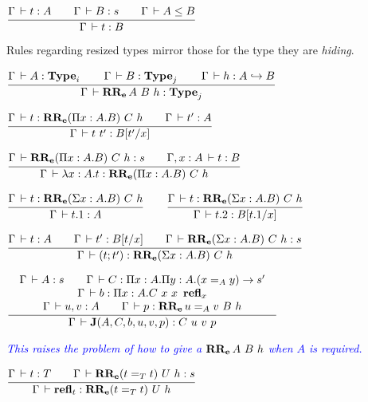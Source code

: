 \documentclass[a4paper,english]{lipics-utf8x}
\newcommand\meta[1]{\noindent\textcolor{blue}{\emph{#1}}}
\begin{document}
  \begin{center}
  \(
    \ru{\Gamma \der t : A \qquad
        \Gamma \der B : s \qquad
        \Gamma \der A \le B
      }{\Gamma \der t : B}
  \)
  \end{center}

  \noindent %
  Rules regarding resized types mirror those for the type they are
  \emph{hiding}.

  \begin{center}
  \(
    \ru{\Gamma \der A : \Type_i \qquad
        \Gamma \der B : \Type_j \qquad
        \Gamma \der h : \emb{A}{B}
      }{\Gamma \der \RRe{A}{B}{h} : \Type_j}
  \)
  \end{center}

  \begin{center}
  \(
    \ru{\Gamma \der t : \RRe{(\Pi x:A.B)}{C}{h} \qquad
        \Gamma \der t' : A
      }{\Gamma \der t\ t' : B[t'/x]}
  \)
  \end{center}

  \begin{center}
  \(
    \ru{\Gamma \der \RRe{(\Pi x:A.B)}{C}{h} : s \qquad
        \Gamma, x:A \der t : B
      }{\Gamma \der \lambda x:A.t : \RRe{(\Pi x:A.B)}{C}{h}}
  \)
  \end{center}

  \begin{center}
  \(
    \ru{\Gamma \der t : \RRe{(\Sigma x:A.B)}{C}{h}
      }{\Gamma \der t.1 : A}
    \qquad
    \ru{\Gamma \der t : \RRe{(\Sigma x:A.B)}{C}{h}
      }{\Gamma \der t.2 : B[t.1/x]}
  \)
  \end{center}

  \begin{center}
  \(
    \ru{\Gamma \der t : A \qquad
        \Gamma \der t' : B[t/x] \qquad
        \Gamma \der \RRe{(\Sigma x:A.B)}{C}{h} : s
      }{\Gamma \der (t;t') : \RRe{(\Sigma x:A.B)}{C}{h}}
  \)
  \end{center}

  \begin{center}
  \(
    \tru{\Gamma \der A : s \qquad
         \Gamma \der C : \Pi x:A. \Pi y:A. (x =_A y) \to s'
       }{\Gamma \der b : \Pi x:A. C\ x\ x\ \refl_x
       }{\Gamma \der u, v : A \qquad
         \Gamma \der p : \RRe{u =_A v}{B}{h}
       }{\Gamma \der \J (A,C,b,u,v,p) : C\ u\ v\ p}
  \)
  \end{center}

  \meta{This raises the problem of how to give a $\operatorname{\mathbf{RR_e}}A\ B\ h$ when $A$ is
  required.}

  \begin{center}
  \(
    \ru{\Gamma \der t : T \qquad
        \Gamma \der \RRe{(t =_T t)}{U}{h} : s
      }{\Gamma \der \refl_t : \RRe{(t =_T t)}{U}{h}}
  \)
  \end{center}
\end{document}
